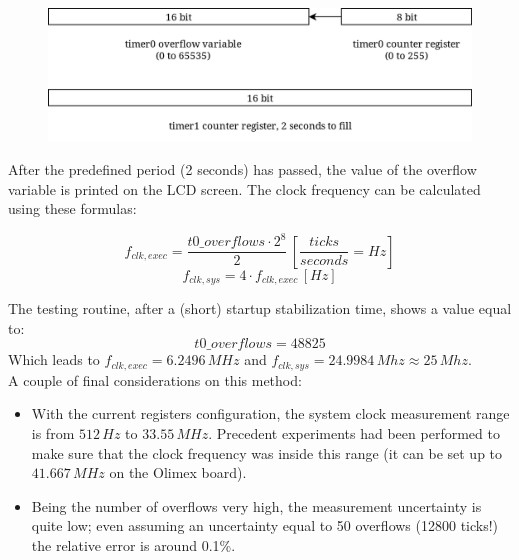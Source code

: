 \begin{figure}[h]
	\centering
	\includegraphics[width=0.7\linewidth]{images/timers}
	\label{fig:timers}
\end{figure}

\flushleft
After the predefined period (2 seconds) has passed, the value of the overflow variable is printed on the LCD screen. The clock frequency can be calculated using these formulas:

$$ f_{clk,exec} = \frac{t0\_overflows \cdot 2^8}{2}\, \left[{\frac{ticks}{seconds} = Hz}\right]$$
$$ f_{clk,sys} = 4 \cdot f_{clk,exec}\,\left[Hz\right] $$

\flushleft
The testing routine, after a (short) startup stabilization time, shows a value equal to:
$$ t0\_overflows = 48825 $$
Which leads to $f_{clk,exec} = 6.2496\,MHz$ and $f_{clk,sys} = 24.9984\,Mhz \approx 25\,Mhz$.\\
\flushleft
A couple of final considerations on this method:
\begin{itemize}
	\item With the current registers configuration, the system clock measurement range is from $512\,Hz$ to $33.55\,MHz$. Precedent experiments had been performed to make sure that the clock frequency was inside this range (it can be set up to $41.667\,MHz$ on the Olimex board).
	\item Being the number of overflows very high, the measurement uncertainty is quite low; even assuming an uncertainty equal to 50 overflows (12800 ticks!) the relative error is around 0.1\%.
\end{itemize}